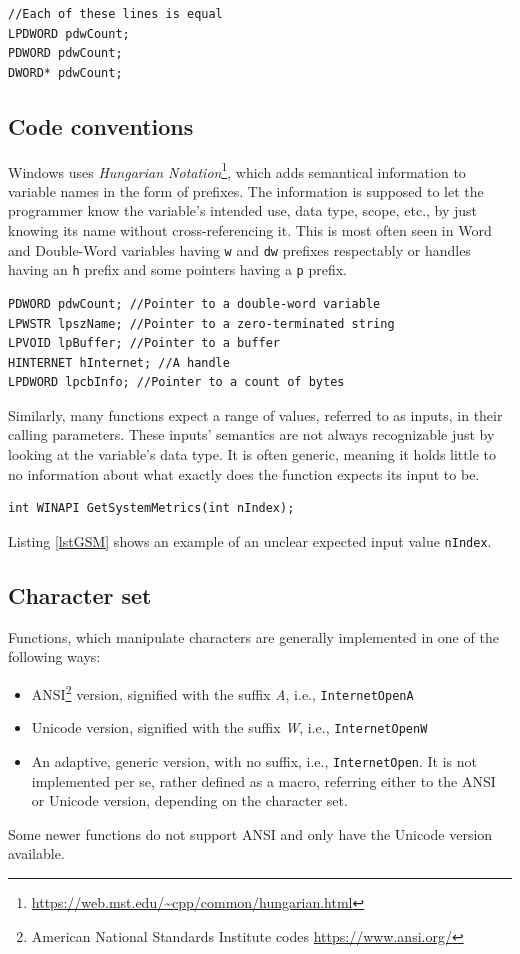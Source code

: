 \begin{lstlisting}[caption={An example of declaring a pointer to a double-word}]
//Each of these lines is equal
LPDWORD pdwCount;
PDWORD pdwCount;
DWORD* pdwCount;
\end{lstlisting}

\subsection{Code conventions}
Windows uses \textit{Hungarian Notation}\footnote{\url{https://web.mst.edu/~cpp/common/hungarian.html}}, which adds semantical information to variable names in the form of prefixes. The information is supposed to let the programmer know the variable's intended use, data type, scope, etc., by just knowing its name without cross-referencing it. This is most often seen in Word and Double-Word variables having \lstinline{w} and \lstinline{dw} prefixes respectably or handles having an \lstinline{h} prefix and some pointers having a \lstinline{p} prefix.\cite{WinConventions}

\begin{lstlisting}[caption={An example of hungarian notation}]
PDWORD pdwCount; //Pointer to a double-word variable
LPWSTR lpszName; //Pointer to a zero-terminated string
LPVOID lpBuffer; //Pointer to a buffer
HINTERNET hInternet; //A handle
LPDWORD lpcbInfo; //Pointer to a count of bytes
\end{lstlisting}

Similarly, many functions expect a range of values, referred to as inputs, in their calling parameters. These inputs' semantics are not always recognizable just by looking at the variable's data type. It is often generic, meaning it holds little to no information about what exactly does the function expects its input to be.
\begin{lstlisting}[caption={GetSystemMetrics prototype},label=lstGSM]
int WINAPI GetSystemMetrics(int nIndex);
\end{lstlisting}
Listing \ref{lstGSM} shows an example of an unclear expected input value \lstinline{nIndex}.\cite{WinGetSM}

\subsection{Character set}
Functions, which manipulate characters are generally implemented in one of the following ways:
\begin{itemize}
    \item ANSI\footnote{American National Standards Institute codes \url{https://www.ansi.org/}} version, signified with the suffix \textit{A}, i.e., \lstinline{InternetOpenA}
    \item Unicode version, signified with the suffix \textit{W}, i.e., \lstinline{InternetOpenW}
    \item An adaptive, generic version, with no suffix, i.e., \lstinline{InternetOpen}. It is not implemented per se, rather defined as a macro, referring either to the ANSI or Unicode version, depending on the character set.
\end{itemize}
Some newer functions do not support ANSI and only have the Unicode version available.\cite{WinUnicode}

